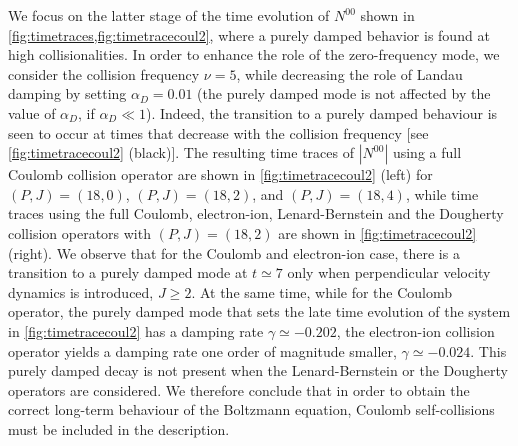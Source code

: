 We focus on the latter stage of the time evolution of $N^{00}$ shown in \cref{fig:timetraces,fig:timetracecoul2}, where a purely damped behavior is found at high collisionalities.
%
In order to enhance the role of the zero-frequency mode, we consider the collision frequency $\nu=5$, while decreasing the role of Landau damping by setting $\alpha_D=0.01$ (the purely damped mode is not affected by the value of $\alpha_D$, if $\alpha_D\ll 1$).
%
{Indeed, the transition to a purely damped behaviour is seen to occur at times that decrease with the collision frequency [see \cref{fig:timetracecoul2} (black)].}
%
The resulting time traces of $|N^{00}|$ using a full Coulomb collision operator are shown in \cref{fig:timetracecoul2} (left) for $(P,J)=(18,0)$, $(P,J)=(18,2)$, and $(P,J)=(18,4)$, while  time traces using the full Coulomb, electron-ion, Lenard-Bernstein and the Dougherty collision operators with $(P,J)=(18,2)$ are shown in \cref{fig:timetracecoul2} (right).
%
We observe that for the Coulomb and electron-ion case, there is a transition to a purely damped mode at $t \simeq 7$ only when perpendicular velocity dynamics is introduced, $J\ge 2$.
%
{At the same time,} while for the Coulomb operator, the purely damped mode {that sets the late time evolution of the system in \cref{fig:timetracecoul2}} has a damping rate $\gamma \simeq -0.202$, the electron-ion collision operator yields a damping rate one order of magnitude smaller, $\gamma \simeq -0.024$.
%
This purely damped decay is not present when the Lenard-Bernstein or the Dougherty operators are considered.
%
We therefore conclude that in order to obtain the correct long-term behaviour of the Boltzmann equation, Coulomb self-collisions must be included in the description.

